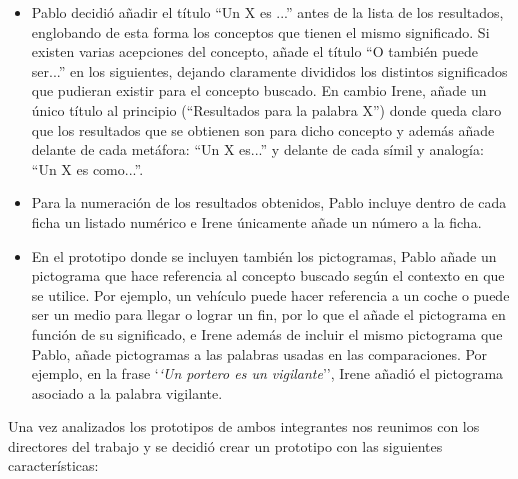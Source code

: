 \begin{itemize}
	\item Pablo decidió añadir el título ``Un X es ...'' antes de la lista de los resultados, englobando de esta forma los conceptos que tienen el mismo significado. Si existen varias acepciones del concepto, añade el título ``O también puede ser...'' en los siguientes, dejando claramente divididos los distintos significados que pudieran existir para el concepto buscado. En cambio Irene, añade un único título al principio (``Resultados para la palabra X'') donde queda claro que los resultados que se obtienen son para dicho concepto y además añade delante de cada metáfora: ``Un X es...''  y delante de cada símil y analogía: ``Un X es como...''.

	\item Para la numeración de los resultados obtenidos, Pablo incluye dentro de cada ficha un listado numérico e Irene únicamente añade un número a la ficha.
	
	\item En el prototipo donde se incluyen también los pictogramas, Pablo añade un pictograma que hace referencia al concepto buscado según el contexto en que se utilice. Por ejemplo, un vehículo puede hacer referencia a un coche o puede ser un medio para llegar o lograr un fin, por lo que el añade el pictograma en función de su significado, e Irene además de incluir el mismo pictograma que Pablo, añade pictogramas a las palabras usadas en las comparaciones. Por ejemplo, en la frase `\textit{`Un portero es un vigilante}'', Irene añadió el pictograma asociado a la palabra vigilante.
\end{itemize}




Una vez analizados los prototipos de ambos integrantes nos reunimos con los directores del trabajo y se decidió crear un prototipo con las siguientes características:


